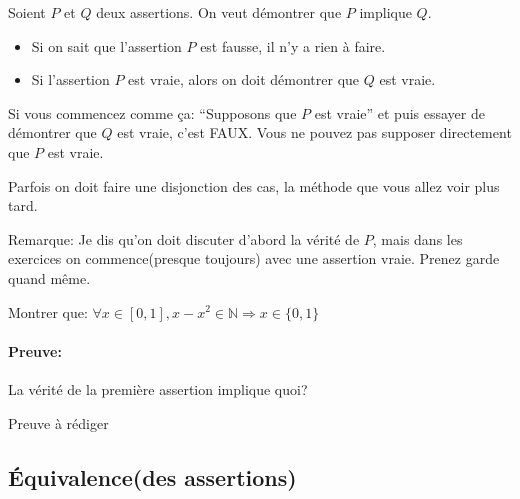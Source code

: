 \documentclass{article}
\begin{document}
\begin{tcolorbox}[colback=green!5!white,colframe=green!75!black,title=Point méthode 4.3/1.2]

Soient $P$ et $Q$ deux assertions. On veut démontrer que $P$ implique $Q$.

\begin{itemize}
 \item Si on sait que l'assertion $P$ est fausse, il n'y a rien à faire.
 \item Si l'assertion $P$ est vraie, alors on doit démontrer que $Q$ est vraie.
\end{itemize}

\tcblower

Si vous commencez comme \c ca: ``Supposons que $P$ est vraie'' et puis essayer de démontrer que $Q$ est vraie, c'est FAUX. Vous ne pouvez pas supposer directement que $P$ est vraie. 

Parfois on doit faire une disjonction des cas, la méthode que vous allez voir plus tard.

\end{tcolorbox}

Remarque: Je dis qu'on doit discuter d'abord la vérité de $P$, mais dans les exercices on commence(presque toujours) avec une assertion vraie. Prenez garde quand même.


\begin{tcolorbox}[colback=cyan!5!white,colframe=cyan!75!black,title=Exercice]

Montrer que: $\forall x \in [0,1], x - x^{2} \in \mathbb{N} \Rightarrow x \in \{0,1\} $


\end{tcolorbox}

\paragraph{Preuve:} La vérité de la première assertion implique quoi?

\noindent Preuve à rédiger














\subsection{Équivalence(des assertions)}
\end{document}
